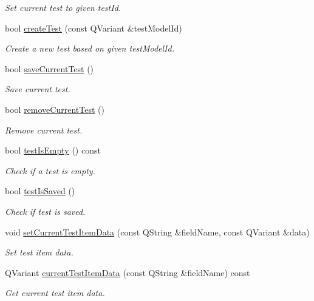 \begin{DoxyCompactItemize}
\begin{DoxyCompactList}\small\item\em Set current test to given test\-Id. \end{DoxyCompactList}\item 
bool \hyperlink{classmdt_tt_test_a327d5b5d8b5677c19023ca91563cfa58}{create\-Test} (const Q\-Variant \&test\-Model\-Id)
\begin{DoxyCompactList}\small\item\em Create a new test based on given test\-Model\-Id. \end{DoxyCompactList}\item 
bool \hyperlink{classmdt_tt_test_aed6d3ec0e08f8e02ca2d4db024e0788f}{save\-Current\-Test} ()
\begin{DoxyCompactList}\small\item\em Save current test. \end{DoxyCompactList}\item 
bool \hyperlink{classmdt_tt_test_ab219c643607fc17d07d3f0be2df7063b}{remove\-Current\-Test} ()
\begin{DoxyCompactList}\small\item\em Remove current test. \end{DoxyCompactList}\item 
bool \hyperlink{classmdt_tt_test_a01ee00b3a78c15b666d4e7a363412838}{test\-Is\-Empty} () const 
\begin{DoxyCompactList}\small\item\em Check if a test is empty. \end{DoxyCompactList}\item 
bool \hyperlink{classmdt_tt_test_a0c725e7c3c841e2b40b98e1e04be16a2}{test\-Is\-Saved} ()
\begin{DoxyCompactList}\small\item\em Check if test is saved. \end{DoxyCompactList}\item 
void \hyperlink{classmdt_tt_test_afb1d31d833bb5307dbb1c953525db0e5}{set\-Current\-Test\-Item\-Data} (const Q\-String \&field\-Name, const Q\-Variant \&data)
\begin{DoxyCompactList}\small\item\em Set test item data. \end{DoxyCompactList}\item 
Q\-Variant \hyperlink{classmdt_tt_test_a047769a2211d826ac4f71bb7881737f7}{current\-Test\-Item\-Data} (const Q\-String \&field\-Name) const 
\begin{DoxyCompactList}\small\item\em Get current test item data. \end{DoxyCompactList}\item 

\end{DoxyCompactItemize}
